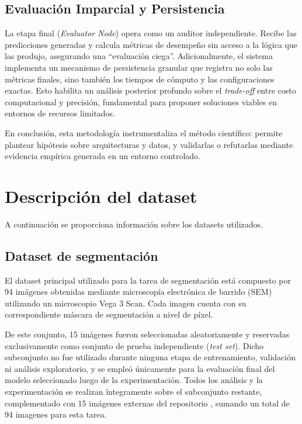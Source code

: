 \documentclass[onecolumn, 12pt , journal]{IEEEtran}
\begin{document}
\subsection{Evaluación Imparcial y Persistencia}
La etapa final (\textit{Evaluator Node}) opera como un auditor independiente. Recibe las predicciones generadas y calcula métricas de desempeño sin acceso a la lógica que las produjo, asegurando una  ``evaluación ciega''.
Adicionalmente, el sistema implementa un mecanismo de persistencia granular que registra no solo las métricas finales, sino también los tiempos de cómputo y las configuraciones exactas. Esto habilita un análisis posterior profundo sobre el \textit{trade-off} entre costo computacional y precisión, fundamental para proponer soluciones viables en entornos de recursos limitados.

En conclusión, esta metodología instrumentaliza el método científico: permite plantear hipótesis sobre arquitecturas y datos, y validarlas o refutarlas mediante evidencia empírica generada en un entorno controlado.



\section{Descripción del dataset}
A continuación se proporciona información sobre los datasets utilizados.
\subsection{Dataset de segmentación}

El dataset principal utilizado para la tarea de segmentación está compuesto por 94 imágenes obtenidas mediante microscopía electrónica de barrido (SEM) utilizando un microscopio Vega 3 Scan. Cada imagen cuenta con su correspondiente máscara de segmentación a nivel de píxel.

De este conjunto, 15 imágenes fueron seleccionadas aleatoriamente y reservadas exclusivamente como conjunto de prueba independiente (\emph{test set}). Dicho subconjunto no fue utilizado durante ninguna etapa de entrenamiento, validación ni análisis exploratorio, y se empleó únicamente para la evaluación final del modelo seleccionado luego de la experimentación. Todos los análisis y la experimentación se realizan íntegramente sobre el subconjunto restante, complementado con 15 imágenes externas del repositorio \cite{repo_imagenes}, sumando un total de 94 imagenes para esta tarea.
\end{document}

